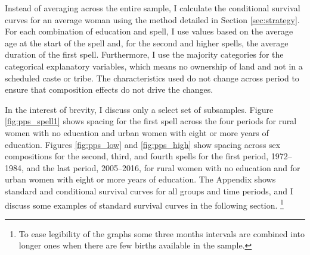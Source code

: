 \documentclass[12pt,letterpaper]{article}
\begin{document}
Instead of averaging across the entire sample, I calculate the conditional
survival curves for an average woman using the method detailed in 
Section \ref{sec:strategy}.
For each combination of education and spell, I use values based on the
average age at the start of the spell and, for the second and higher
spells, the average duration of the first spell.
Furthermore, I use the majority categories for the categorical explanatory 
variables, which means no ownership of land and not in a scheduled caste or 
tribe.
The characteristics used do not change across period to ensure that 
composition effects do not drive the changes.

In the interest of brevity, I discuss only a select set of subsamples.
Figure \ref{fig:pps_spell1} shows spacing for the first spell across the
four periods for rural women with no education and urban women with 
eight or more years of education.
Figures \ref{fig:pps_low} and \ref{fig:pps_high} show spacing across sex
compositions for the second, third, and fourth spells for the first period, 
1972--1984, and the last period, 2005--2016, for rural women with no 
education and for urban women with eight or more years of education.
The Appendix shows standard and conditional survival curves for all groups and 
time periods, and I discuss some examples of standard survival
curves in the following section.%
\footnote{
To ease legibility of the graphs some three months intervals are combined
into longer ones when there are few births available in the sample.
}


\end{document}
